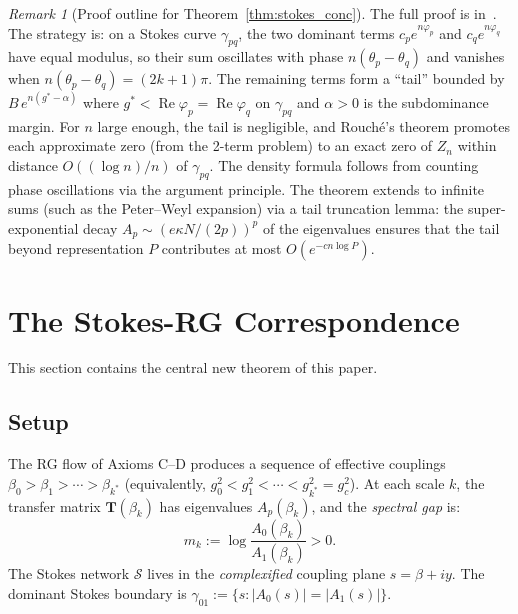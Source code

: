 \documentclass[12pt]{article}
\theoremstyle{definition}
\theoremstyle{remark}
\newtheorem{remark}[theorem]{Remark}
\newcommand{\re}{\operatorname{Re}}
\newcommand{\gB}{g^2_c}
\begin{document}
\begin{remark}[Proof outline for Theorem~\ref{thm:stokes_conc}]
\label{rem:stokes_proof}
The full proof is in~\cite{OlbrykPsi2026}.  The strategy is:
on a Stokes curve $\gamma_{pq}$, the two dominant terms
$c_p e^{n\varphi_p}$ and $c_q e^{n\varphi_q}$ have equal modulus,
so their sum oscillates with phase $n(\theta_p - \theta_q)$ and
vanishes when $n(\theta_p - \theta_q) = (2k+1)\pi$.  The remaining
terms form a ``tail'' bounded by $B\,e^{n(g^* - \alpha)}$ where
$g^* < \re\varphi_p = \re\varphi_q$ on $\gamma_{pq}$ and
$\alpha > 0$ is the subdominance margin.  For $n$ large enough,
the tail is negligible, and Rouch\'e's theorem promotes each
approximate zero (from the 2-term problem) to an exact zero of $Z_n$
within distance $O((\log n)/n)$ of $\gamma_{pq}$.  The density
formula follows from counting phase oscillations via the argument
principle.  The theorem extends to infinite sums (such as the
Peter--Weyl expansion) via a tail truncation lemma: the
super-exponential decay $A_p \sim (e\kappa N/(2p))^p$ of the
eigenvalues ensures that the tail beyond representation $P$
contributes at most $O(e^{-cn\log P})$.
\end{remark}

\section{The Stokes-RG Correspondence}
\label{sec:stokes_rg}

This section contains the central new theorem of this paper.

\subsection{Setup}

The RG flow of Axioms C--D produces a sequence of effective couplings
$\beta_0 > \beta_1 > \cdots > \beta_{k^*}$ (equivalently,
$g^2_0 < g^2_1 < \cdots < g^2_{k^*} = \gB$). At each scale $k$,
the transfer matrix $\mathbf{T}(\beta_k)$ has eigenvalues
$A_p(\beta_k)$, and the \emph{spectral gap} is:
\begin{equation}
m_k := \log\frac{A_0(\beta_k)}{A_1(\beta_k)} > 0.
\end{equation}
The Stokes network $\mathcal{S}$ lives in the \emph{complexified}
coupling plane $s = \beta + iy$. The dominant Stokes boundary is
$\gamma_{01} := \{s : |A_0(s)| = |A_1(s)|\}$.
\end{document}
